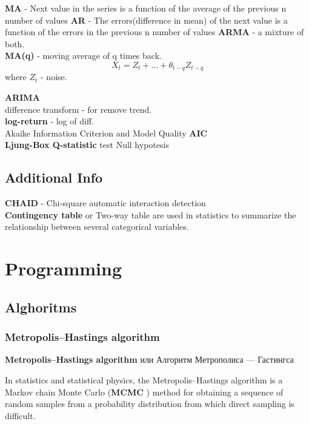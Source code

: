 \documentclass{book}
\begin{document}
\textbf{MA} - Next value in the series is a function of the average of the previous n number of values \textbf{AR} - The errors(difference in mean) of the next value is a function of the errors in the previous n number of values \textbf{ARMA} - a mixture of both.\\

\textbf{MA(q)}  - moving average of q times back. $$X_t = Z_t + ... + \theta_{t-q}Z_{t-q}$$ where $Z_t$ - noise.


\textbf{ARIMA} \\
difference transform - for remove trend.\\
\textbf{log-return} - log of diff.\\
Akaike Information Criterion and Model Quality \textbf{AIC}\\
\textbf{Ljung-Box Q-statistic}  test Null hypotesis

\chapter{Additional Info}
\textbf{CHAID} - Chi-square automatic interaction detection\\
\textbf{Contingency table} or Two-way table are used in statistics to summarize the relationship between several categorical variables. \\


\part{Programming}
\chapter{Alghoritms}
\section{Metropolis–Hastings algorithm}
\textbf{Metropolis–Hastings algorithm} или Алгоритм Метрополиса — Гастингса

In statistics and statistical physics, the Metropolis–Hastings algorithm is a Markov chain Monte Carlo (\textbf{MCMC} ) method for obtaining a sequence of random samples from a probability distribution from which direct sampling is difficult.



\printindex
\end{document}
